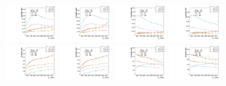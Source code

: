 \begin{figure}[htbp]
  \centering
  \includegraphics[width=0.2\textwidth]{fig/2Dfit/paramSignalYield_NonVBFSig_mu_HP_bb_LDy.pdf}
  \includegraphics[width=0.2\textwidth]{fig/2Dfit/paramSignalYield_NonVBFSig_e_HP_bb_LDy.pdf}
  \includegraphics[width=0.2\textwidth]{fig/2Dfit/paramSignalYield_NonVBFSig_mu_LP_bb_LDy.pdf}
  \includegraphics[width=0.2\textwidth]{fig/2Dfit/paramSignalYield_NonVBFSig_e_LP_bb_LDy.pdf}\\
  \includegraphics[width=0.2\textwidth]{fig/2Dfit/paramSignalYield_NonVBFSig_mu_HP_nobb_LDy.pdf}
  \includegraphics[width=0.2\textwidth]{fig/2Dfit/paramSignalYield_NonVBFSig_e_HP_nobb_LDy.pdf}
  \includegraphics[width=0.2\textwidth]{fig/2Dfit/paramSignalYield_NonVBFSig_mu_LP_nobb_LDy.pdf}
  \includegraphics[width=0.2\textwidth]{fig/2Dfit/paramSignalYield_NonVBFSig_e_LP_nobb_LDy.pdf}\\

\end{figure}
